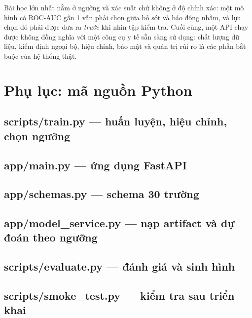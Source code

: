 \documentclass[12pt]{article}
\begin{document}
Bài học lớn nhất nằm ở ngưỡng và xác suất chứ không ở độ chính xác: một mô hình có ROC-AUC gần 1 vẫn phải chọn giữa
bỏ sót và báo động nhầm, và lựa chọn đó phải được đưa ra \emph{trước} khi nhìn tập kiểm tra. Cuối cùng, một API chạy
được không đồng nghĩa với một công cụ y tế sẵn sàng sử dụng: chất lượng dữ liệu, kiểm định ngoại bộ, hiệu chỉnh, bảo
mật và quản trị rủi ro là các phần bắt buộc của hệ thống thật.

\appendix
\section{Phụ lục: mã nguồn Python}

\subsection{scripts/train.py --- huấn luyện, hiệu chỉnh, chọn ngưỡng}


\subsection{app/main.py --- ứng dụng FastAPI}


\subsection{app/schemas.py --- schema 30 trường}


\subsection{app/model\_service.py --- nạp artifact và dự đoán theo ngưỡng}


\subsection{scripts/evaluate.py --- đánh giá và sinh hình}


\subsection{scripts/smoke\_test.py --- kiểm tra sau triển khai}

\end{document}
